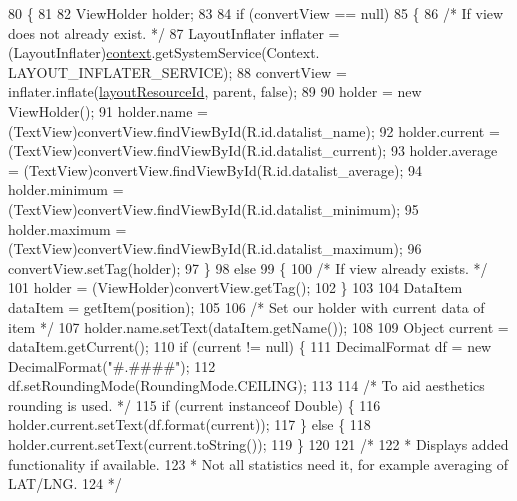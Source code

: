 \begin{DoxyCode}
80                                                                           \{
81 
82         ViewHolder holder;
83 
84         \textcolor{keywordflow}{if} (convertView == null)
85         \{
86             \textcolor{comment}{/* If view does not already exist. */}
87             LayoutInflater inflater = (LayoutInflater)\hyperlink{class_android_app_1_1_data_list_adapter_a739dc817ded5d59af25f97be1a88cf75}{context}.getSystemService(Context.
      LAYOUT\_INFLATER\_SERVICE);
88             convertView = inflater.inflate(\hyperlink{class_android_app_1_1_data_list_adapter_ac4680f2696f50995ecd43fa418f15524}{layoutResourceId}, parent, \textcolor{keyword}{false});
89 
90             holder = \textcolor{keyword}{new} ViewHolder();
91             holder.name = (TextView)convertView.findViewById(R.id.datalist\_name);
92             holder.current = (TextView)convertView.findViewById(R.id.datalist\_current);
93             holder.average = (TextView)convertView.findViewById(R.id.datalist\_average);
94             holder.minimum = (TextView)convertView.findViewById(R.id.datalist\_minimum);
95             holder.maximum = (TextView)convertView.findViewById(R.id.datalist\_maximum);
96             convertView.setTag(holder);
97         \}
98         \textcolor{keywordflow}{else}
99         \{
100             \textcolor{comment}{/* If view already exists. */}
101             holder = (ViewHolder)convertView.getTag();
102         \}
103 
104         DataItem dataItem = getItem(position);
105 
106         \textcolor{comment}{/* Set our holder with current data of item */}
107         holder.name.setText(dataItem.getName());
108 
109         Object current = dataItem.getCurrent();
110         \textcolor{keywordflow}{if} (current != null) \{
111             DecimalFormat df = \textcolor{keyword}{new} DecimalFormat(\textcolor{stringliteral}{"#.####"});
112             df.setRoundingMode(RoundingMode.CEILING);
113 
114             \textcolor{comment}{/* To aid aesthetics rounding is used. */}
115             \textcolor{keywordflow}{if} (current instanceof Double) \{
116                 holder.current.setText(df.format(current));
117             \} \textcolor{keywordflow}{else} \{
118                 holder.current.setText(current.toString());
119             \}
120 
121             \textcolor{comment}{/*}
122 \textcolor{comment}{             * Displays added functionality if available.}
123 \textcolor{comment}{             * Not all statistics need it, for example averaging of LAT/LNG.}
124 \textcolor{comment}{             */}

\end{DoxyCode}
